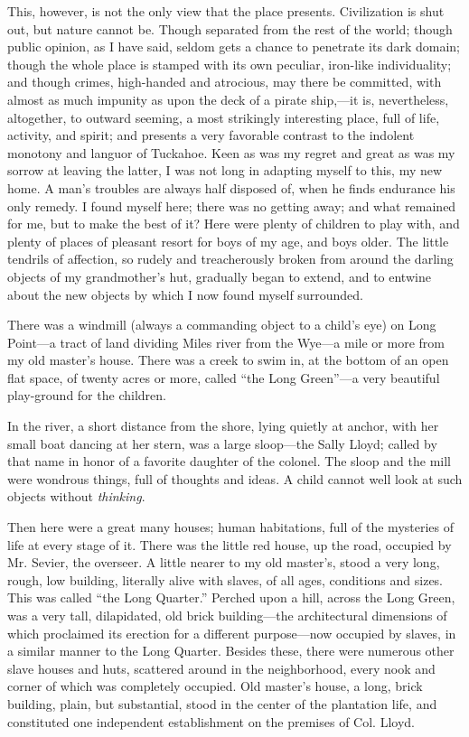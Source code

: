 This, however, is not the only view that the place presents.
Civilization is shut out, but nature cannot be. Though separated from
the rest of the world; {\protect\hypertarget{65}{}{}}though public
opinion, as I have said, seldom gets a chance to penetrate its dark
domain; though the whole place is stamped with its own peculiar,
iron-like individuality; and though crimes, high-handed and atrocious,
may there be committed, with almost as much impunity as upon the deck of
a pirate ship,---it is, nevertheless, altogether, to outward seeming, a
most strikingly interesting place, full of life, activity, and spirit;
and presents a very favorable contrast to the indolent monotony and
languor of Tuckahoe. Keen as was my regret and great as was my sorrow at
leaving the latter, I was not long in adapting myself to this, my new
home. A man's troubles are always half disposed of, when he finds
endurance his only remedy. I found myself here; there was no getting
away; and what remained for me, but to make the best of it? Here were
plenty of children to play with, and plenty of places of pleasant resort
for boys of my age, and boys older. The little tendrils of affection, so
rudely and treacherously broken from around the darling objects of my
grandmother's hut, gradually began to extend, and to entwine about the
new objects by which I now found myself surrounded.

There was a windmill (always a commanding object to a child's eye) on
Long Point---a tract of land dividing Miles river from the Wye---a mile
or more from my old master's house. There was a creek to swim in, at the
bottom of an open flat space, of twenty acres or more, called ``the Long
Green''---a very beautiful play-ground for the children.

In the river, a short distance from the shore, lying quietly at anchor,
with her small boat dancing at her {\protect\hypertarget{66}{}{}}stern,
was a large sloop---the Sally Lloyd; called by that name in honor of a
favorite daughter of the colonel. The sloop and the mill were wondrous
things, full of thoughts and ideas. A child cannot well look at such
objects without \emph{thinking}.

Then here were a great many houses; human habitations, full of the
mysteries of life at every stage of it. There was the little red house,
up the road, occupied by Mr. Sevier, the overseer. A little nearer to my
old master's, stood a very long, rough, low building, literally alive
with slaves, of all ages, conditions and sizes. This was called ``the
Long Quarter.'' Perched upon a hill, across the Long Green, was a very
tall, dilapidated, old brick building---the architectural dimensions of
which proclaimed its erection for a different purpose---now occupied by
slaves, in a similar manner to the Long Quarter. Besides these, there
were numerous other slave houses and huts, scattered around in the
neighborhood, every nook and corner of which was completely occupied.
Old master's house, a long, brick building, plain, but substantial,
stood in the center of the plantation life, and constituted one
independent establishment on the premises of Col. Lloyd.

